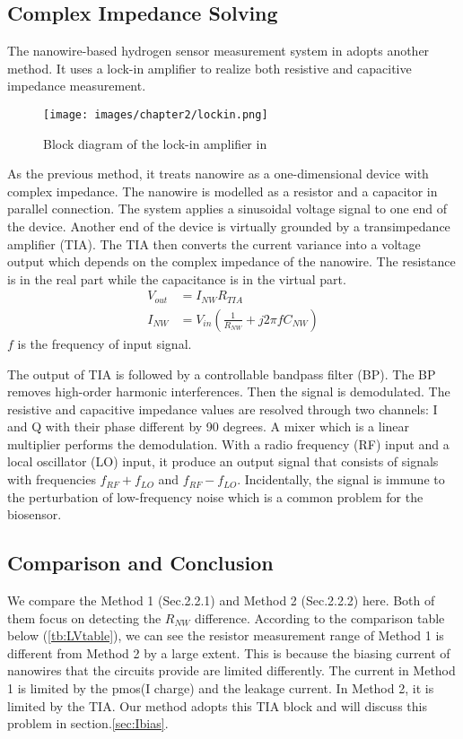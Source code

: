 \subsection{Complex Impedance Solving}
The nanowire-based hydrogen sensor measurement system in \cite{Jlockin} adopts another method.
It uses a lock-in amplifier to realize both resistive and capacitive impedance measurement.

\begin{figure}[!htbp]
        \centering
        \texttt{[image: images/chapter2/lockin.png]}
        \caption{Block diagram of the lock-in amplifier in \cite{Jlockin}}
        \label{fig:lockin}
\end{figure}

As the previous method, it treats nanowire as a one-dimensional device with complex impedance.
The nanowire is modelled as a resistor and a capacitor in parallel connection.
The system applies a sinusoidal voltage signal to one end of the device.
Another end of the device is virtually grounded by a transimpedance amplifier (TIA).
The TIA then converts the current variance into a voltage output which depends on the complex impedance of the nanowire.
The resistance is in the real part while the capacitance is in the virtual part.
\setlength{\mathindent}{5.5cm}
\begin{align}
    V_{out} &= I_{NW}R_{TIA} \\
    I_{NW} &= V_{in}(\frac{1}{R_{NW}} + j 2\pi fC_{NW})
\end{align}
$f$ is the frequency of input signal.

The output of TIA is followed by a controllable bandpass filter (BP).
The BP removes high-order harmonic interferences.
Then the signal is demodulated.
The resistive and capacitive impedance values are resolved through two channels: I and Q with their phase different by 90 degrees.
A mixer which is a linear multiplier performs the demodulation.
With a radio frequency (RF) input and a local oscillator (LO) input, it produce an output signal that consists of signals with frequencies $f_{RF} + f_{LO}$ and $f_{RF} - f_{LO}$.
Incidentally, the signal is immune to the perturbation of low-frequency noise which is a common problem for the biosensor.

\subsection{Comparison and Conclusion} \label{sec:ch2CC}
We compare the Method 1 (Sec.2.2.1) and Method 2 (Sec.2.2.2) here.
Both of them focus on detecting the $R_{NW}$ difference.
According to the comparison table below (\ref{tb:LVtable}), we can see the resistor measurement range of Method 1 is different from Method 2 by a large extent.
This is because the biasing current of nanowires that the circuits provide are limited differently.
The current in Method 1 is limited by the pmos(I charge) and the leakage current.
In Method 2, it is limited by the TIA.
Our method adopts this TIA block and will discuss this problem in section.\ref{sec:Ibias}.

